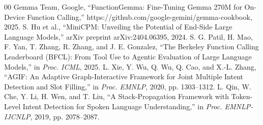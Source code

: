 \documentclass[conference]{IEEEtran}
\begin{document}
\begin{thebibliography}{00}
 Gemma Team, Google, ``FunctionGemma: Fine-Tuning Gemma 270M for On-Device Function Calling,'' https://github.com/google-gemini/gemma-cookbook, 2025.
 S. Hu et al., ``MiniCPM: Unveiling the Potential of End-Side Large Language Models,'' arXiv preprint arXiv:2404.06395, 2024.
 S. G. Patil, H. Mao, F. Yan, T. Zhang, R. Zhang, and J. E. Gonzalez, ``The Berkeley Function Calling Leaderboard (BFCL): From Tool Use to Agentic Evaluation of Large Language Models,'' in \emph{Proc. ICML}, 2025.
 L. Xie, Y. Wu, Q. Wu, Q. Cao, and X.-L. Zhang, ``AGIF: An Adaptive Graph-Interactive Framework for Joint Multiple Intent Detection and Slot Filling,'' in \emph{Proc. EMNLP}, 2020, pp. 1303--1312.
 L. Qin, W. Che, Y. Li, H. Wen, and T. Liu, ``A Stack-Propagation Framework with Token-Level Intent Detection for Spoken Language Understanding,'' in \emph{Proc. EMNLP-IJCNLP}, 2019, pp. 2078--2087.
\end{thebibliography}
\end{document}

